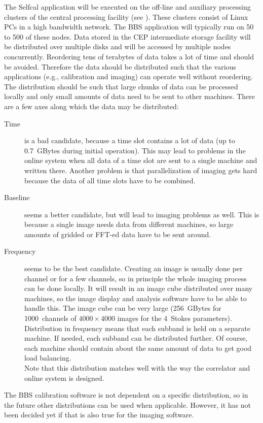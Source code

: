 \documentclass[10pt]{lofar}
\begin{document}
The Selfcal application will be executed on the off-line and auxiliary
processing clusters of the central processing facility (see
\cite{LOFAR-ASTRON-ADD-012}). These clusters consist of Linux PCs in a high
bandwidth network. The BBS application will typically run on 50 to 500 of these
nodes. %
Data stored in the CEP intermediate storage facility will be distributed over
multiple disks and will be accessed by multiple nodes concurrently. 
Reordering tens of terabytes of data takes a lot of time and should be avoided.
Therefore the data should be distributed such that the various applications
(e.g., calibration and imaging) can operate well without reordering. The
distribution should be such that large chunks of data can be
processed locally and only small amounts of data need to be sent to other
machines. There are a few axes along which the data may be distributed:
\begin{description}
\item [Time] is a bad candidate, because a time slot contains a lot of data (up to
0.7~GBytes during initial operation). This may lead to problems in the online
system when all data of a time slot are sent to a single machine and written
there. Another problem is that parallelization of imaging gets hard because the
data of all time slots have to be combined.
\item [Baseline] seems a better candidate, but will lead to imaging problems as
well. This is because a single image needs data from different machines, so
large amounts of gridded or FFT-ed data have to be sent around.
\item [Frequency] seems to be the best candidate. Creating an image is usually
done per channel or for a few channels, so in principle the whole imaging
process can be done locally. It will result in an image cube distributed over
many machines, so the image display and analysis software have to be able to
handle this. The image cube can be very large (256~GBytes for 1000~channels of
$4000 \times 4000$ images for the 4~Stokes parameters). \\
Distribution in frequency means that each subband is held on a separate machine.
If needed, each subband can be distributed further. Of course, each machine
should contain about the same amount of data to get good load balancing. \\
Note that this distribution matches well with the way the correlator and online
system is designed.
\end{description}
The BBS calibration software is not dependent on a specific distribution, so in
the future other distributions can be used when applicable. However, it has not
been decided yet if that is also true for the imaging software.
\end{document}
